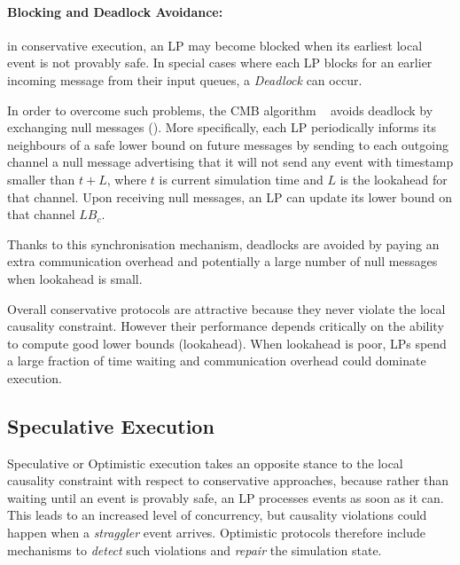 \paragraph{Blocking and Deadlock Avoidance:} in conservative execution, an
\ac{LP} may become blocked when its earliest local event is not provably safe.
In special cases where each \ac{LP} blocks for an earlier incoming message from
their input queues, a \emph{Deadlock} can occur.

In order to overcome such problems, the \ac{CMB} algorithm
~\cite{chandyMisra1983DDD, bryant1977simulation} avoids deadlock by exchanging
null messages (). More specifically, each \ac{LP} periodically
informs its neighbours of a safe lower bound on future messages by sending to
each outgoing channel a null message advertising that it will not send any
event with timestamp smaller than $t + L$, where $t$ is current simulation time
and $L$ is the lookahead for that channel. Upon receiving null messages, an
\ac{LP} can update its lower bound on that channel $LB_c$.


Thanks to this synchronisation mechanism, deadlocks are avoided by paying an
extra communication overhead and potentially a large number of null messages
when lookahead is small.
\\
\newline

Overall conservative protocols are attractive because they never violate the
local causality constraint. However their performance depends critically on the
ability to compute good lower bounds (lookahead). When lookahead is poor,
\ac{LP}s spend a large fraction of time waiting and communication overhead
could dominate execution.

\subsection{Speculative Execution}\label{ssec:speculative_pdes}

Speculative or Optimistic execution takes an opposite stance to the local causality
constraint with respect to conservative approaches, because rather than waiting until
an event is provably safe, an \ac{LP} processes events as soon as it can. This leads
to an increased level of concurrency, but causality violations could happen when
a \emph{straggler} event arrives. Optimistic protocols therefore include mechanisms
to \emph{detect} such violations and \emph{repair} the simulation state.

